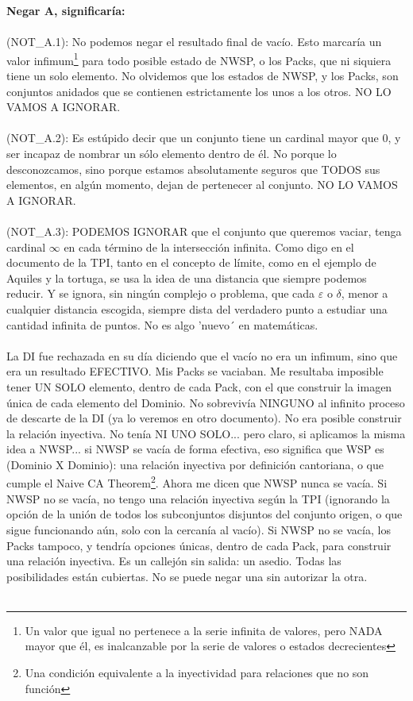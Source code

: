 	\noindent
	\textbf{Negar A, significaría:}\\\\
	(NOT\_A.1): No podemos negar el resultado final de vacío. Esto marcaría un valor infimum\footnote{Un valor que igual no pertenece a la serie infinita de valores, pero NADA mayor que él, es inalcanzable por la serie de valores o estados decrecientes} para todo posible estado de NWSP, o los Packs, que ni siquiera tiene un solo elemento. No olvidemos que los estados de NWSP, y los Packs, son conjuntos anidados que se contienen estrictamente los unos a los otros. NO LO VAMOS A IGNORAR.\\\\
	(NOT\_A.2): Es estúpido decir que un conjunto tiene un cardinal mayor que $0$, y ser incapaz de nombrar un sólo elemento dentro de él. No porque lo desconozcamos, sino porque estamos absolutamente seguros que TODOS sus elementos, en algún momento, dejan de pertenecer al conjunto. NO LO VAMOS A IGNORAR.\\\\
	(NOT\_A.3): PODEMOS IGNORAR que el conjunto que queremos vaciar, tenga cardinal $\infty$ en cada término de la intersección infinita. Como digo en el documento de la TPI, tanto en el concepto de límite, como en el ejemplo de Aquiles y la tortuga, se usa la idea de una distancia que siempre podemos reducir. Y se ignora, sin ningún complejo o problema, que cada $\varepsilon$ o $\delta$, menor a cualquier distancia escogida, siempre dista del verdadero punto a estudiar una cantidad infinita de puntos. No es algo 'nuevo´ en matemáticas.\\\\
	
	\noindent
	La DI fue rechazada en su día diciendo que el vacío no era un infimum, sino que era un resultado EFECTIVO. Mis Packs se vaciaban. Me resultaba imposible tener UN SOLO elemento, dentro de cada Pack, con el que construir la imagen única de cada elemento del Dominio. No sobrevivía NINGUNO al infinito proceso de descarte de la DI (ya lo veremos en otro documento). No era posible construir la relación inyectiva. No tenía NI UNO SOLO... pero claro, si aplicamos la misma idea a NWSP... si NWSP se vacía de forma efectiva, eso significa que WSP es (Dominio X Dominio): una relación inyectiva por definición cantoriana, o que cumple el Naive CA Theorem\footnote{Una condición equivalente a la inyectividad para relaciones que no son función}. Ahora me dicen que NWSP nunca se vacía. Si NWSP no se vacía, no tengo una relación inyectiva según la TPI (ignorando la opción de la unión de todos los subconjuntos disjuntos del conjunto origen, o que sigue funcionando aún, solo con la cercanía al vacío). Si NWSP no se vacía, los Packs tampoco, y tendría opciones únicas, dentro de cada Pack, para construir una relación inyectiva. Es un callejón sin salida: un asedio. Todas las posibilidades están cubiertas. No se puede negar una sin autorizar la otra.\\\\
	
